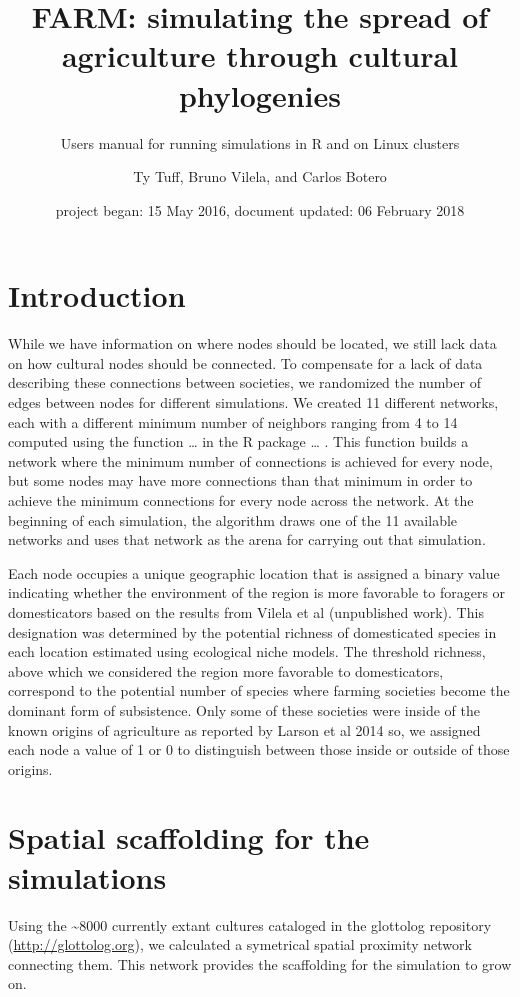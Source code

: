 \documentclass[]{book}
\title{FARM: simulating the spread of agriculture through cultural phylogenies}
\subtitle{Users manual for running simulations in R and on Linux clusters}
\author{Ty Tuff, Bruno Vilela, and Carlos Botero}
\date{project began: 15 May 2016, document updated: 06 February 2018}
\theoremstyle{definition}
\theoremstyle{definition}
\theoremstyle{definition}
\theoremstyle{remark}
\begin{document}
\maketitle

{
\setcounter{tocdepth}{1}
\tableofcontents
}
\chapter{Introduction}\label{introduction}

While we have information on where nodes should be located, we still
lack data on how cultural nodes should be connected. To compensate for a
lack of data describing these connections between societies, we
randomized the number of edges between nodes for different simulations.
We created 11 different networks, each with a different minimum number
of neighbors ranging from 4 to 14 computed using the function \ldots{}
in the R package \ldots{} . This function builds a network where the
minimum number of connections is achieved for every node, but some nodes
may have more connections than that minimum in order to achieve the
minimum connections for every node across the network. At the beginning
of each simulation, the algorithm draws one of the 11 available networks
and uses that network as the arena for carrying out that simulation.

Each node occupies a unique geographic location that is assigned a
binary value indicating whether the environment of the region is more
favorable to foragers or domesticators based on the results from Vilela
et al (unpublished work). This designation was determined by the
potential richness of domesticated species in each location estimated
using ecological niche models. The threshold richness, above which we
considered the region more favorable to domesticators, correspond to the
potential number of species where farming societies become the dominant
form of subsistence. Only some of these societies were inside of the
known origins of agriculture as reported by Larson et al 2014 so, we
assigned each node a value of 1 or 0 to distinguish between those inside
or outside of those origins.

\chapter{Spatial scaffolding for the
simulations}\label{spatial-scaffolding-for-the-simulations}

Using the \textasciitilde{}8000 currently extant cultures cataloged in
the glottolog repository (\url{http://glottolog.org}), we calculated a
symetrical spatial proximity network connecting them. This network
provides the scaffolding for the simulation to grow on.
\end{document}
